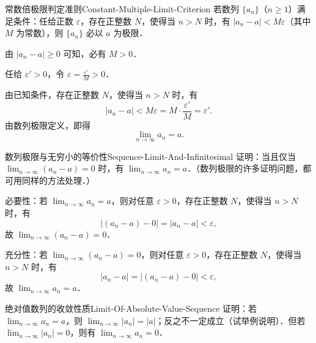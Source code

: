 \begin{problem}{常数倍极限判定准则}{Constant-Multiple-Limit-Criterion}
    若数列 $\{a_n\}$（$n \geqslant 1$）满足条件：任给正数 $\varepsilon$，存在正整数 $N$，使得当 $n > N$ 时，有 $|a_n - a| < M\varepsilon$（其中 $M$ 为常数），则 $\{a_n\}$ 必以 $a$ 为极限．
\end{problem}

\begin{myproof}
    由 $|a_n - a| \geqslant 0$ 可知，必有 $M > 0$．

    任给 $\varepsilon' > 0$，令 $\varepsilon = \frac{\varepsilon'}{M} > 0$．

    由已知条件，存在正整数 $N$，使得当 $n > N$ 时，有
    \begin{equation}
        |a_n - a| < M\varepsilon = M \cdot \frac{\varepsilon'}{M} = \varepsilon'.
    \end{equation}
    由数列极限定义，即得
    \begin{equation}
        \lim_{n\to\infty} a_n = a.
    \end{equation}
\end{myproof}

\begin{problem}{数列极限与无穷小的等价性}{Sequence-Limit-And-Infinitesimal}
    证明：当且仅当 $\lim_{n\to\infty} (a_n - a) = 0$ 时，有 $\lim_{n\to\infty} a_n = a$．（数列极限的许多证明问题，都可用同样的方法处理．）
\end{problem}

\begin{myproof}
    必要性：若 $\lim_{n\to\infty} a_n = a$，则对任意 $\varepsilon > 0$，存在正整数 $N$，使得当 $n > N$ 时，有
    \begin{equation}
        |(a_n - a) - 0| = |a_n - a| < \varepsilon,
    \end{equation}
    故 $\lim_{n\to\infty} (a_n - a) = 0$．

    充分性：若 $\lim_{n\to\infty} (a_n - a) = 0$，则对任意 $\varepsilon > 0$，存在正整数 $N$，使得当 $n > N$ 时，有
    \begin{equation}
        |a_n - a| = |(a_n - a) - 0| < \varepsilon,
    \end{equation}
    故 $\lim_{n\to\infty} a_n = a$．
\end{myproof}

\begin{problem}{绝对值数列的收敛性质}{Limit-Of-Absolute-Value-Sequence}
    证明：若 $\lim_{n\to\infty} a_n = a$，则 $\lim_{n\to\infty} |a_n| = |a|$；反之不一定成立（试举例说明）．但若 $\lim_{n\to\infty} |a_n| = 0$，则有 $\lim_{n\to\infty} a_n = 0$．
\end{problem}

